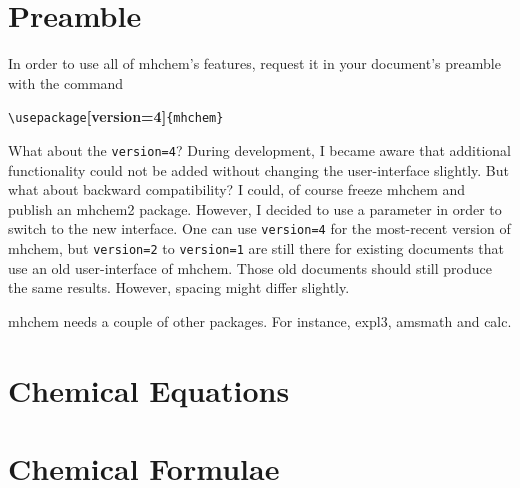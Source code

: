 \documentclass[a4paper,notitlepage,parskip=half]{scrreprt}
\newenvironment{annotation}{\bgroup\footnotesize}{\par\egroup}
\begin{document}
\section{Preamble}

In order to use all of mhchem's features, request it in your document's preamble with the command

{\color{mhchem}\Large\verb|\usepackage|{\ttfamily\bfseries [version=4]}\verb|{mhchem}|}
\marginpar{\Large !}

\begin{annotation}
What about the \verb|version=4|? During development, I became aware that additional functionality could not be added without changing the user-interface slightly. But what about backward compatibility? I could, of course freeze mhchem and publish an mhchem2 package. However, I decided to use a parameter in order to switch to the new interface. One can use \verb|version=4| for the most-recent version of mhchem, but \verb|version=2| to \verb|version=1| are still there for existing documents that use an old user-interface of mhchem. Those old documents should still produce the same results. However, spacing might differ slightly.
\end{annotation}

mhchem needs a couple of other packages. For instance, expl3, amsmath and calc.


\section{Chemical Equations}

\begin{SideBySideExample}[xrightmargin=6cm]
\end{SideBySideExample}

\begin{SideBySideExample}[xrightmargin=6cm]
\end{SideBySideExample}



\section{Chemical Formulae}

\begin{SideBySideExample}[xrightmargin=2.5cm]
\end{SideBySideExample}

\begin{SideBySideExample}[xrightmargin=2.5cm]
\end{SideBySideExample}
\end{document}
